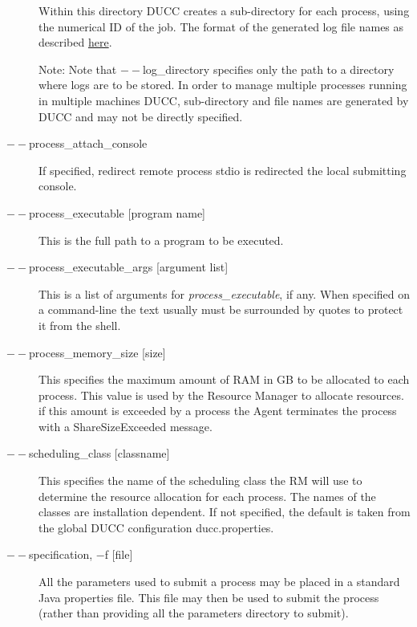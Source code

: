 \begin{description}
          Within this directory DUCC creates a sub-directory for each process, using the numerical 
          ID of the job. The format of the generated log file names as described
          \hyperref[chap:job-logs]{here}.
          
          Note: Note that $--$log\_directory specifies only the path to a directory where 
          logs are to be stored. In order to manage multiple processes running in multiple 
          machines DUCC, sub-directory and file names are generated by DUCC and may 
          not be directly specified. 

        \item[$--$process\_attach\_console] If specified, redirect remote process stdio is 
          redirected the local submitting console.
          
        \item[$--$process\_executable {[program name]}] This is the full path to a program to be
          executed.

        \item[$--$process\_executable\_args {[argument list]}] This is a list of arguments for
          {\em process\_executable}, if any.   When specified on a command-line the text usually must be
          surrounded by quotes to protect it from the shell.

        \item[$--$process\_memory\_size {[size]} ] This specifies the maximum amount of RAM in GB to
          be allocated to each process.  This value is used by the Resource Manager to allocate
          resources. if this amount is exceeded by a process the Agent terminates the process with a
          ShareSizeExceeded message.

        \item[$--$scheduling\_class {[classname]} ] This specifies the name of the scheduling class the
          RM will use to determine the resource allocation for each process. The names of the
          classes are installation dependent. If not specified, the default is taken from the global
          DUCC configuration ducc.properties.

        \item[$--$specification, $-$f {[file]} ] All the parameters used to submit a process may be placed
          in a standard Java properties file.  This file may then be used to submit the process
          (rather than providing all the parameters directory to submit).
          

\end{description}
